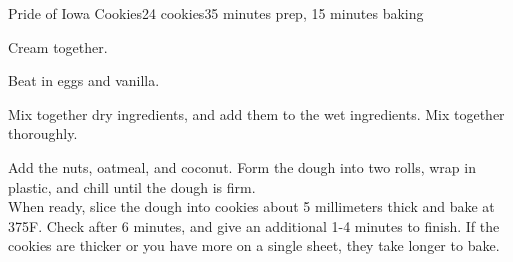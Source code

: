 \documentclass[../Cookbook.tex]{subfiles}
\begin{document}
\begin{recipe}{Pride of Iowa Cookies}{24 cookies}{35 minutes prep, 15 minutes baking}

	Cream together.

	Beat in eggs and vanilla.

	Mix together dry ingredients, and add them to the wet ingredients. Mix together thoroughly.

	Add the nuts, oatmeal, and coconut. Form the dough into two rolls, wrap in plastic, and chill until the dough is firm.\\
	When ready, slice the dough into cookies about 5 millimeters thick and bake at 375\0F. Check after 6 minutes, and give an additional 1-4 minutes to finish. If the cookies are thicker or you have more on a single sheet, they take longer to bake.

\end{recipe}
\end{document}
